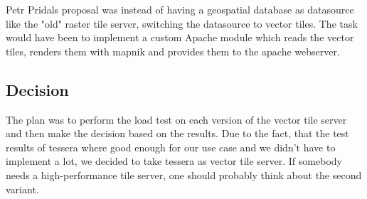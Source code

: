 Petr Pridals proposal was instead of having a geospatial database as datasource like the "old" raster tile server, switching the datasource to vector tiles. The task would have been to implement a custom Apache module which reads the vector tiles, renders them with mapnik and provides them to the apache webserver.

\subsection{Decision}
The plan was to perform the load test on each version of the vector tile server and then make the decision based on the results. Due to the fact, that the test results of tessera where good enough for our use case and we didn't have to implement a lot, we decided to take tessera as vector tile server.
If somebody needs a high-performance tile server, one should probably think about the second variant.
